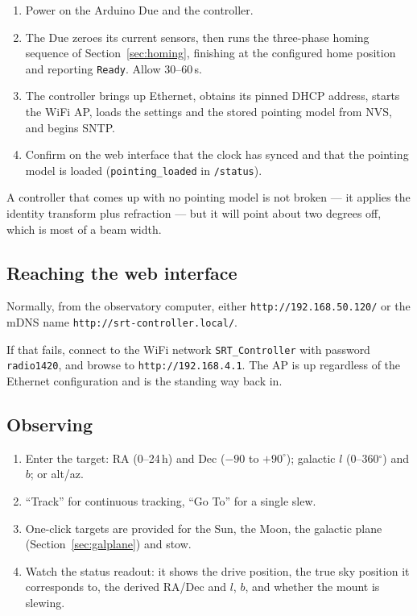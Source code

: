 \documentclass[11pt,a4paper]{article}
\begin{document}
\begin{enumerate}
    \item Power on the Arduino Due and the controller.
    \item The Due zeroes its current sensors, then runs the three-phase homing sequence of Section~\ref{sec:homing}, finishing at the configured home position and reporting \texttt{Ready}. Allow 30--60\,s.
    \item The controller brings up Ethernet, obtains its pinned DHCP address, starts the WiFi AP, loads the settings and the stored pointing model from NVS, and begins SNTP.
    \item Confirm on the web interface that the clock has synced and that the pointing model is loaded (\texttt{pointing\_loaded} in \texttt{/status}).
\end{enumerate}

A controller that comes up with no pointing model is not broken --- it applies the identity transform plus refraction --- but it will point about two degrees off, which is most of a beam width.

\subsection{Reaching the web interface}

Normally, from the observatory computer, either \texttt{http://192.168.50.120/} or the mDNS name \texttt{http://srt-controller.local/}.

If that fails, connect to the WiFi network \texttt{SRT\_Controller} with password \texttt{radio1420}, and browse to \texttt{http://192.168.4.1}. The AP is up regardless of the Ethernet configuration and is the standing way back in.

\subsection{Observing}

\begin{enumerate}
    \item Enter the target: RA (0--24\,h) and Dec ($-90$ to $+90^\circ$); galactic $l$ (0--360$^\circ$) and $b$; or alt/az.
    \item ``Track'' for continuous tracking, ``Go To'' for a single slew.
    \item One-click targets are provided for the Sun, the Moon, the galactic plane (Section~\ref{sec:galplane}) and stow.
    \item Watch the status readout: it shows the drive position, the true sky position it corresponds to, the derived RA/Dec and $l$, $b$, and whether the mount is slewing.
\end{enumerate}
\end{document}
